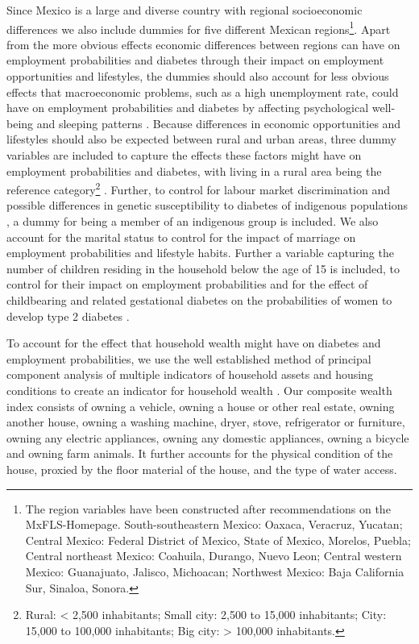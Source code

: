 Since Mexico is a large and diverse country with regional socioeconomic differences
we also include dummies for five different Mexican regions\footnote{The region variables have been constructed after recommendations on
the MxFLS-Homepage. South-southeastern Mexico: Oaxaca, Veracruz, Yucatan;
Central Mexico: Federal District of Mexico, State of Mexico, Morelos,
Puebla; Central northeast Mexico: Coahuila, Durango, Nuevo Leon; Central
western Mexico: Guanajuato, Jalisco, Michoacan; Northwest Mexico:
Baja California Sur, Sinaloa, Sonora.}. Apart from the more obvious effects economic differences between
regions can have on employment probabilities and diabetes through their
impact on employment opportunities and lifestyles, the dummies should
also account for less obvious effects that macroeconomic problems,
such as a high unemployment rate, could have on employment probabilities
and diabetes by affecting psychological well-being and sleeping patterns
\parencite{Antillon2014}. Because differences in economic opportunities
and lifestyles should also be expected between rural and urban areas,
three dummy variables are included to capture the effects these factors
might have on employment probabilities and diabetes, with living in a rural
area being the reference category\footnote{Rural: < 2,500 inhabitants; Small city: 2,500 to 15,000 inhabitants;
City: 15,000 to 100,000 inhabitants; Big city: > 100,000 inhabitants. } \parencite{Villalpando2010}. Further, to control for labour market discrimination
and possible differences in genetic susceptibility to diabetes of
indigenous populations \parencite{Yu2007}, a dummy for being a member
of an indigenous group is included. We also account for the marital
status to control for the impact of marriage on employment probabilities
and lifestyle habits. Further a variable capturing the number of children
residing in the household below the age of 15 is included, to control
for their impact on employment probabilities and for the effect of childbearing
and related gestational diabetes on the probabilities of women to
develop type 2 diabetes \parencite{Bellamy2009}. 

To account for the effect that household wealth might have on diabetes and employment probabilities,
we use the well established method of principal component analysis
of multiple indicators of household assets and housing conditions
to create an indicator for household wealth \parencite{Filmer2001}. Our
composite wealth index consists of owning a vehicle, owning a house
or other real estate, owning another house, owning a washing machine,
dryer, stove, refrigerator or furniture, owning any electric appliances,
owning any domestic appliances, owning a bicycle and owning farm animals.
It further accounts for the physical condition of the house, proxied
by the floor material of the house, and the type of water access. 

